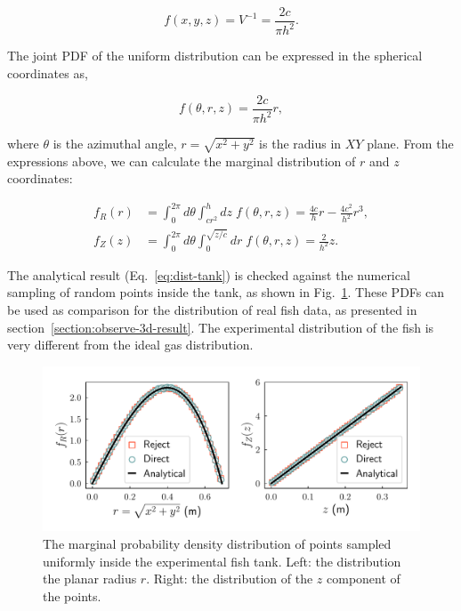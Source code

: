 \documentclass[11pt,twoside]{report}
\begin{document}
\begin{equation*}
	f(x, y, z) = V^{-1} = \frac{2c}{\pi h^2}.		
\end{equation*}

\noindent The joint PDF of the uniform distribution can be expressed in the spherical coordinates as,

\begin{equation}
	f(\theta, r, z) = \frac{2c}{\pi h^2} r,
\label{eq:density-pdf-tank}
\end{equation}

\noindent where $\theta$ is the azimuthal angle, $r = \sqrt{x^2 + y^2}$ is the radius in $XY$ plane.  From the expressions above, we can calculate the marginal distribution of $r$ and $z$ coordinates:

\begin{equation}
\begin{split}
	f_R(r) &= \int_0^{2\pi}{d \theta} \int_{cr^2}^{h}{dz} \; f(\theta, r, z)
		= \frac{4c}{h} r - \frac{4 c^2}{h^2} r^3, \\[2em]
	f_Z(z) &= \int_0^{2\pi}{d \theta} \int_0^{\sqrt{z/c}}{dr} \; f(\theta, r, z) 
	= \frac{2}{h^2} z.
\end{split}
\label{eq:dist-tank}
\end{equation}

\noindent The analytical result (Eq.~\ref{eq:dist-tank}) is checked against the numerical sampling of random points inside the tank, as shown in Fig.~\ref{fig:dist-tank}. These PDFs can be used as comparison for the distribution of real fish data, as presented in section~\ref{section:observe-3d-result}. The experimental distribution of the fish is very different from the ideal gas distribution.

\begin{figure}
  \includegraphics[width=\linewidth]{density-tank}
  \caption[The 3D geometry of the experimental fish tank]{
  The marginal probability density distribution of points sampled uniformly inside the experimental fish tank.
  Left: the distribution the planar radius $r$.
  Right: the distribution of the $z$ component of the points.
  }
  \label{fig:dist-tank}
\end{figure}
\end{document}
